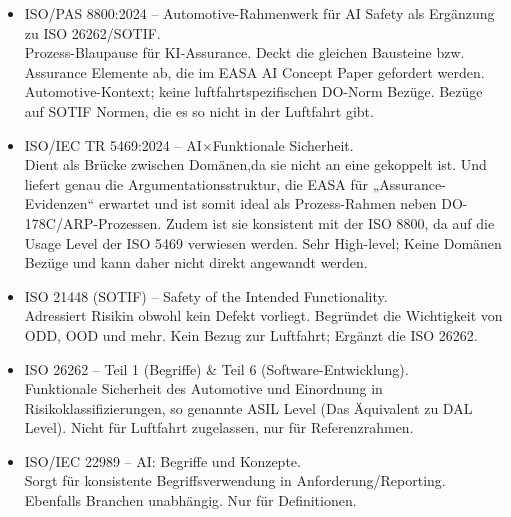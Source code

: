 \begin{itemize}
  \item ISO/PAS 8800:2024 – Automotive-Rahmenwerk für AI Safety als Ergänzung zu ISO 26262/SOTIF.\\
      {Prozess-Blaupause für KI-Assurance. Deckt die gleichen Bausteine bzw. Assurance Elemente ab, die im EASA AI Concept Paper gefordert werden.}
      {Automotive-Kontext; keine luftfahrtspezifischen DO-Norm Bezüge. Bezüge auf SOTIF Normen, die es so nicht in der Luftfahrt gibt.}

  \item ISO/IEC TR 5469:2024 – AI$\times$Funktionale Sicherheit.\\
      {Dient als Brücke zwischen Domänen,da sie nicht an eine gekoppelt ist. Und liefert genau die Argumentationsstruktur, die EASA für „Assurance-Evidenzen“ erwartet und ist somit ideal als Prozess-Rahmen neben DO-178C/ARP-Prozessen.
      Zudem ist sie konsistent mit der ISO 8800, da auf die Usage Level der ISO 5469 verwiesen werden.}
      {Sehr High-level; Keine Domänen Bezüge und kann daher nicht direkt angewandt werden.}

  \item ISO 21448 (SOTIF) – Safety of the Intended Functionality.\\
      {Adressiert Risikin obwohl kein Defekt vorliegt. Begründet die Wichtigkeit von ODD, OOD und mehr.}
      {Kein Bezug zur Luftfahrt; Ergänzt die ISO 26262.}

  \item ISO 26262 – Teil 1 (Begriffe) \& Teil 6 (Software-Entwicklung).\\
      {Funktionale Sicherheit des Automotive und Einordnung in Risikoklassifizierungen, so genannte ASIL Level (Das Äquivalent zu DAL Level).}
      {Nicht für Luftfahrt zugelassen, nur für Referenzrahmen.}

  \item ISO/IEC 22989 – AI: Begriffe und Konzepte.\\
      {Sorgt für konsistente Begriffsverwendung in Anforderung/Reporting. Ebenfalls Branchen unabhängig.}
      {Nur für Definitionen.}


\end{itemize}

